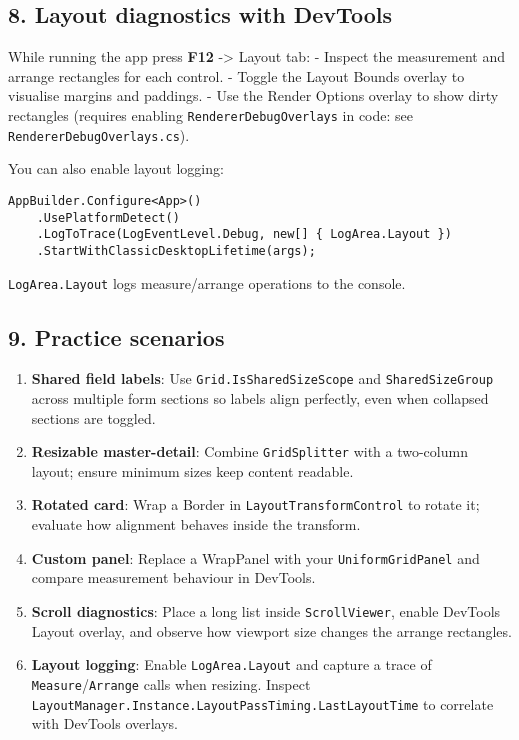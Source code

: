 \subsection{8. Layout diagnostics with
DevTools}\label{layout-diagnostics-with-devtools}

While running the app press \textbf{F12} -\textgreater{} Layout tab: -
Inspect the measurement and arrange rectangles for each control. -
Toggle the Layout Bounds overlay to visualise margins and paddings. -
Use the Render Options overlay to show dirty rectangles (requires
enabling \passthrough{\lstinline!RendererDebugOverlays!} in code: see
\passthrough{\lstinline!RendererDebugOverlays.cs!}).

You can also enable layout logging:

\begin{lstlisting}
AppBuilder.Configure<App>()
    .UsePlatformDetect()
    .LogToTrace(LogEventLevel.Debug, new[] { LogArea.Layout })
    .StartWithClassicDesktopLifetime(args);
\end{lstlisting}

\passthrough{\lstinline!LogArea.Layout!} logs measure/arrange operations
to the console.

\subsection{9. Practice scenarios}\label{practice-scenarios}

\begin{enumerate}
\def\labelenumi{\arabic{enumi}.}
\tightlist
\item
  \textbf{Shared field labels}: Use
  \passthrough{\lstinline!Grid.IsSharedSizeScope!} and
  \passthrough{\lstinline!SharedSizeGroup!} across multiple form
  sections so labels align perfectly, even when collapsed sections are
  toggled.
\item
  \textbf{Resizable master-detail}: Combine
  \passthrough{\lstinline!GridSplitter!} with a two-column layout;
  ensure minimum sizes keep content readable.
\item
  \textbf{Rotated card}: Wrap a Border in
  \passthrough{\lstinline!LayoutTransformControl!} to rotate it;
  evaluate how alignment behaves inside the transform.
\item
  \textbf{Custom panel}: Replace a WrapPanel with your
  \passthrough{\lstinline!UniformGridPanel!} and compare measurement
  behaviour in DevTools.
\item
  \textbf{Scroll diagnostics}: Place a long list inside
  \passthrough{\lstinline!ScrollViewer!}, enable DevTools Layout
  overlay, and observe how viewport size changes the arrange rectangles.
\item
  \textbf{Layout logging}: Enable
  \passthrough{\lstinline!LogArea.Layout!} and capture a trace of
  \passthrough{\lstinline!Measure!}/\passthrough{\lstinline!Arrange!}
  calls when resizing. Inspect
  \passthrough{\lstinline!LayoutManager.Instance.LayoutPassTiming.LastLayoutTime!}
  to correlate with DevTools overlays.
\end{enumerate}


